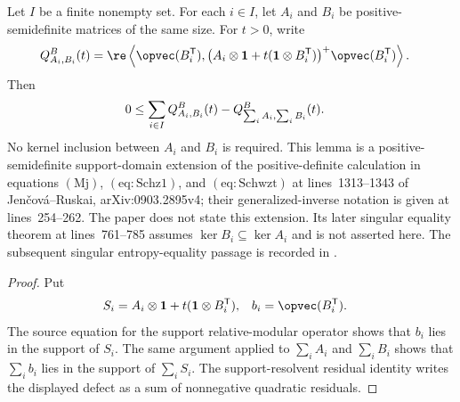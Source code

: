 \begin{lemma}
    \label{lem:support_sourceB_quadratic_sum_sub_nonnegative}
    \leanok
    Let $I$ be a finite nonempty set. For each $i\in I$, let $A_i$ and $B_i$
    be positive-semidefinite matrices of the same size. For $t>0$, write
    \begin{align}
        Q^B_{A_i,B_i}(t)
        &=
        \re\left\langle
          \opvec(B_i^{\mathsf T}),
          \bigl(A_i\otimes\mathbf 1+
            t(\mathbf 1\otimes B_i^{\mathsf T})\bigr)^+
          \opvec(B_i^{\mathsf T})
        \right\rangle.
        \notag
    \end{align}
    Then
    \begin{align}
        0
        &\leq
        \sum_{i\in I}Q^B_{A_i,B_i}(t)
          -Q^B_{\sum_i A_i,\sum_i B_i}(t).
        \notag
    \end{align}
    No kernel inclusion between $A_i$ and $B_i$ is required. This lemma is a
    positive-semidefinite support-domain extension of the positive-definite
    calculation in equations $(\mathrm{Mj})$, $(\mathrm{eq:Schz1})$, and
    $(\mathrm{eq:Schwzt})$ at lines~1313--1343 of Jen\v{c}ov\'a--Ruskai,
    arXiv:0903.2895v4; their generalized-inverse notation is given at
    lines~254--262. The paper does not state this extension. Its later
    singular equality theorem at lines~761--785 assumes
    $\ker B_i\subseteq\ker A_i$ and is not asserted here. The subsequent
    singular entropy-equality passage is recorded in
    .
\end{lemma}

\begin{proof}\leanok
    Put
    \begin{align}
        S_i
        &=A_i\otimes\mathbf 1+t(\mathbf 1\otimes B_i^{\mathsf T}),&
        b_i&=\opvec(B_i^{\mathsf T}).
        \notag
    \end{align}
    The source equation for the support relative-modular operator shows that
    $b_i$ lies in the support of $S_i$. The same argument applied to
    $\sum_i A_i$ and $\sum_i B_i$ shows that $\sum_i b_i$ lies in the
    support of $\sum_i S_i$. The support-resolvent residual identity writes
    the displayed defect as a sum of nonnegative quadratic residuals.
\end{proof}

